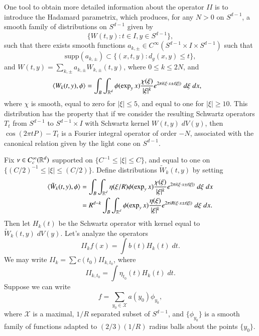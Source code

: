One tool to obtain more detailed information about the operator $II$ is to introduce the Hadamard parametrix, which produces, for any $N > 0$ on $S^{d-1}$, a smooth family of distributions on $S^{d-1}$ given by
%
\[ \{ W(t,y): t \in I, y \in S^{d-1} \}, \]
such that there exists %
smooth functions $a_{k,\pm} \in C^\infty(S^{d-1} \times I \times S^{d-1})$ such that
%
\[ \text{supp}(a_{k,\pm}) \subset \{ (x,t,y) : d_g(x,y) \leq t \}, \]
%
and $W(t,y) = \sum_{k,\pm} a_{k,\pm} W_{k,\pm}(t,y)$, where $0 \leq k \leq 2N$, and
%
\begin{align*}
    \langle W_k(t,y), \phi \rangle &= \int_B \int_{\operatorname{\mathbb{R}}^d} \phi( \exp_y x ) \frac{\chi(\xi)}{|\xi|^k} e^{2 \pi i (\xi \cdot x \pm t |\xi|)}\; d\xi\; dx,
\end{align*}
%
where $\chi$ is smooth, equal to zero for $|\xi| \leq 5$, and equal to one for $|\xi| \geq 10$. This distribution has the property that if we consider the resulting Schwartz operators $T_t$ from $S^{d-1}$ to $S^{d-1} \times I$ with Schwartz kernel $W(t,y)\; dV(y)$, then $\cos(2 \pi t P) - T_t$ is a Fourier integral operator of order $-N$, associated with the canonical relation given by the light cone on $S^{d-1}$.


Fix $\nu \in C_c^\infty(\operatorname{\mathbb{R}}^d)$ supported on $\{ C^{-1} \leq |\xi| \leq C \}$, and equal to one on $\{ (C/2)^{-1} \leq |\xi| \leq (C/2) \}$. Define distributions $\tilde{W}_k(t,y)$ by setting
%
\begin{align*}
    \langle \tilde{W}_k(t,y), \phi \rangle &= \int_B \int_{\operatorname{\mathbb{R}}^d} \eta( \xi / R ) \phi( \exp_y x ) \frac{\chi(\xi)}{|\xi|^k} e^{2 \pi i (\xi \cdot x \pm t |\xi|)}\; d\xi\; dx\\
    &= R^{d - k} \int_B \int_{\operatorname{\mathbb{R}}^d} \phi( \exp_y x) \frac{\eta(\xi)}{|\xi|^k} e^{2 \pi i R ( \xi \cdot x \pm t |\xi| )}\; d\xi\; dx.
\end{align*}
%
Then let $H_k(t)$ be the Schwartz operator with kernel equal to $\tilde{W}_k(t,y)\; dV(y)$. Let's analyze the operators
%
\[ II_k f(x) = \int b(t) H_k(t)\; dt. \]
%
We may write $II_k = \sum c(t_0) II_{k,t_0}$, where
%
\[ II_{k,t_0} = \int \eta_{t_0}(t) H_k(t)\; dt. \]
%
Suppose we can write
%
\[ f = \sum_{y_0 \in \mathcal{X}} a(y_0) \phi_{y_0}, \]
%
where $\mathcal{X}$ is a maximal, $1/R$ separated subset of $S^{d-1}$, and $\{ \phi_{y_0} \}$ is a smooth family of functions adapted to $(2/3) (1/R)$ radius balls about the points $\{ y_0 \}$.


